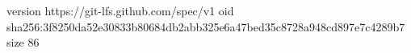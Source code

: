 version https://git-lfs.github.com/spec/v1
oid sha256:3f8250da52e30833b80684db2abb325e6a47bed35c8728a948cd897e7c4289b7
size 86
